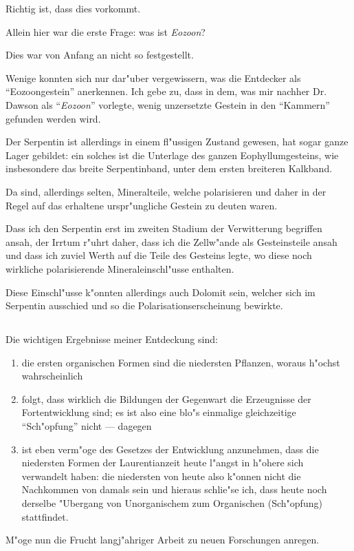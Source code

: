 \documentclass[a4paper, 11pt, oneside, german]{article}
\begin{document}
Richtig ist, dass dies vorkommt.

Allein hier war die erste Frage: was ist \emph{Eozoon}?

Dies war von Anfang an nicht so festgestellt.

Wenige konnten sich nur dar"uber vergewissern, was die Entdecker als "`Eozoongestein"' anerkennen. Ich gebe zu, dass in dem, was mir nachher Dr. Dawson als "`\emph{Eozoon}"' vorlegte, wenig unzersetzte Gestein in den "`Kammern"' gefunden werden wird.

Der Serpentin ist allerdings in einem fl"ussigen Zustand gewesen, hat sogar ganze Lager gebildet: ein solches ist die Unterlage des ganzen Eophyllumgesteins, wie insbesondere das breite Serpentinband, unter dem ersten breiteren Kalkband.

Da sind, allerdings selten, Mineralteile, welche polarisieren und daher in der Regel auf das erhaltene urspr"ungliche Gestein zu deuten waren.

Dass ich den Serpentin erst im zweiten Stadium der Verwitterung begriffen ansah, der Irrtum r"uhrt daher, dass ich die Zellw"ande als Gesteinsteile ansah und dass ich zuviel Werth auf die Teile des Gesteins legte, wo diese noch wirkliche polarisierende Mineraleinschl"usse enthalten.

Diese Einschl"usse k"onnten allerdings auch Dolomit sein, welcher sich im Serpentin ausschied und so die Polarisationserscheinung bewirkte.
\clearpage
\subsection{}
\paragraph{}
Die wichtigen Ergebnisse meiner Entdeckung sind:
\begin{enumerate}
\item die ersten organischen Formen sind die niedersten Pflanzen, woraus h"ochst wahrscheinlich
\item folgt, dass wirklich die Bildungen der Gegenwart die Erzeugnisse der Fortentwicklung sind; es ist also eine blo"s einmalige gleichzeitige "`Sch"opfung"' nicht --- dagegen
\item ist eben verm"oge des Gesetzes der Entwicklung anzunehmen, dass die niedersten Formen der Laurentianzeit heute l"angst in h"ohere sich verwandelt haben: die niedersten von heute also k"onnen nicht die Nachkommen von damals sein und hieraus schlie"se ich, dass heute noch derselbe "Ubergang von Unorganischem zum Organischen (Sch"opfung) stattfindet.
\end{enumerate}
M"oge nun die Frucht langj"ahriger Arbeit zu neuen Forschungen anregen.
\end{document}
